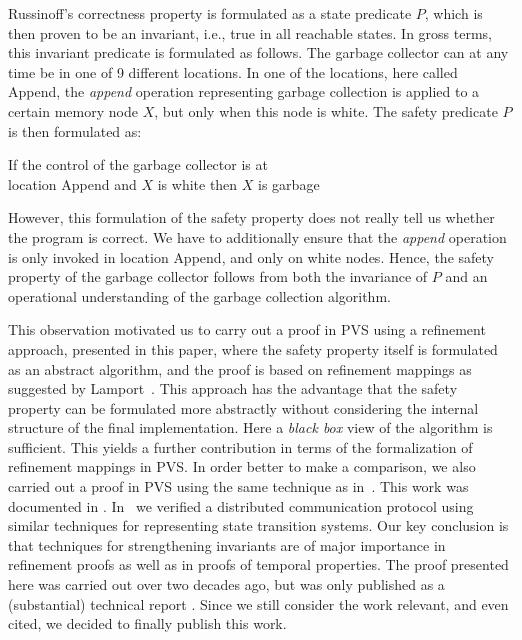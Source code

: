 Russinoff's correctness property is formulated as a  state predicate $P$, which
is then proven to be an invariant, i.e., true in all reachable  states.
In gross  terms, 
this invariant predicate is formulated as  follows.  The garbage collector
can at 
any time be in one of 9 different locations.  In one of the locations,
here  called {\sc  Append},  the {\em append} operation  representing
garbage collection is applied to a certain  memory node $X$, but only
when this node is white. The safety  predicate  $P$  is  then formulated  as:

\begin{center}
  If the control of the garbage collector is at\\ location {\sc Append} and
  $X$ is white then $X$ is garbage 
\end{center}

\noindent
However, this formulation of   the  safety property does not really  tell us
whether the  program is correct.  We 
have to additionally ensure that  the {\em append} operation is
only invoked in location {\sc Append}, and only on white nodes.  Hence,
the safety property of the garbage collector follows from both the
invariance of $P$ and an operational understanding of the
garbage collection algorithm.  

This  observation motivated  us  to  carry  out a   proof  in PVS
\cite{pvs-url} using   a  refinement approach,  presented in this paper,
where   the safety property  itself  is formulated  as an  abstract algorithm, and
the proof  is  based  on refinement  mappings  as suggested  by
Lamport~\cite{TLA:TOPLAS94}.  This  approach   has the advantage  that  the
safety property can  be formulated more abstractly without considering
the internal structure of the final implementation.  Here a {\em black
  box} view   of the  algorithm is   sufficient.  This yields a
further contribution in terms of the 
formalization of refinement mappings in PVS.
In  order   better to make  a
comparison, we also carried out a proof in PVS using the same
technique   as  in~\cite{Rus:GC}.  This    work   was documented  in
\cite{havelund-pvs-gc-99}.
%
In~\cite{HS:BRP}  we verified  a  distributed communication  protocol
using similar techniques for representing  state transition systems. 
Our  key conclusion  is  that  techniques for
strengthening invariants are  of major importance in refinement
proofs as well as in proofs of temporal properties.  
%
The proof presented here was carried out over two decades ago, but
was only published as a (substantial) technical report \cite{havelund-shankar-gc-report-97}. 
Since we still consider the work relevant, and even
cited, we decided to finally publish this work.

